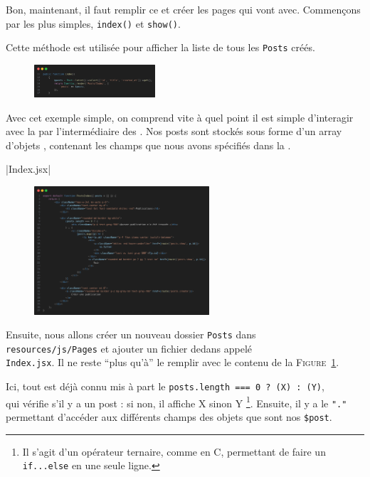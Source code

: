 Bon, maintenant, il faut remplir ce \controller{} et créer les pages qui vont avec. Commençons par les plus simples, \verb|index()| et \verb|show()|.

Cette méthode est utilisée pour afficher la liste de tous les \texttt{Posts} créés. 

\begin{figure}
    \includegraphics[width=0.4\textwidth]{figures-C1/postscontroller_index.png}
\end{figure}
Avec cet exemple simple, on comprend vite à quel point il est simple d'interagir avec la \db{} par l'intermédiaire des \models{}. Nos posts sont stockés sous forme d'un array d'objets \php{}, contenant les champs que nous avons spécifiés dans la \migration{}. 

|Index.jsx|
\begin{figure}
    \vspace{-0.5cm}
    \includegraphics[width=0.581\textwidth]{figures-C1/posts_index.png}
    \caption{\protect{}\label{fig:post_index}}
\end{figure}
Ensuite, nous allons créer un nouveau dossier \verb|Posts| dans  \\ \verb|resources/js/Pages| et ajouter un fichier dedans appelé \\ \verb|Index.jsx|. Il ne reste ``plus qu'à'' le remplir avec le contenu de la \textsc{Figure~\ref{fig:post_index}}.

Ici, tout est déjà connu mis à part le \verb|posts.length === 0 ? (X) : (Y)|,  \\ qui vérifie s'il y a un post : si non, il affiche X sinon Y \footnote{Il s'agit d'un opérateur ternaire, comme en C, permettant de faire un \texttt{if...else} en une seule ligne.}. Ensuite, il y a le \verb|"."| permettant d'accéder aux différents champs des objets que sont nos \verb|$post|.


